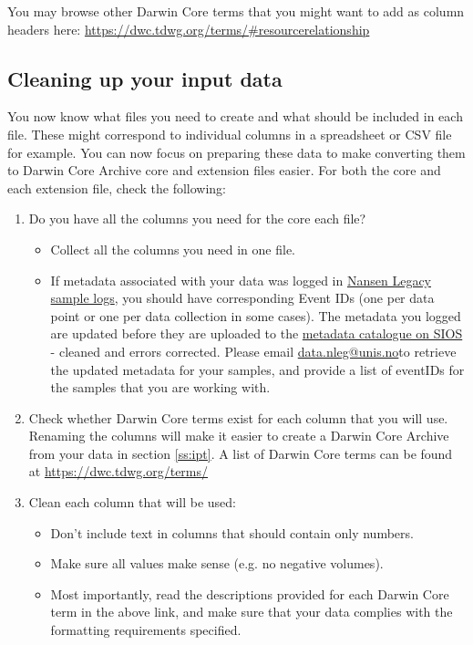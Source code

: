 \documentclass[a4paper,english, 11pt]{article}
\makeatletter
\newcommand{\emailme}{\href{mailto:data.nleg@unis.no}{data.nleg@unis.no}}
\makeatother
\begin{document}
You may browse other Darwin Core terms that you might want to add as column headers here:
\url{https://dwc.tdwg.org/terms/#resourcerelationship}
 
\subsection{Cleaning up your input data}
\label{ss:cleaningdwca}

You now know what files you need to create and what should be included in each file. These might correspond to individual columns in a spreadsheet or CSV file for example. You can now focus on preparing these data to make converting them to Darwin Core Archive core and extension files easier. For both the core and each extension file, check the following:

\begin{enumerate}
\item Do you have all the columns you need for the core each file?
\begin{itemize}
\item Collect all the columns you need in one file.
\item If metadata associated with your data was logged in \href{https://sios-svalbard.org/cgi-bin/darwinsheet/?setup=aen}{Nansen Legacy sample logs}, you should have corresponding Event IDs (one per data point or one per data collection in some cases). The metadata you logged are updated before they are uploaded to the \href{https://sios-svalbard.org/aen/tools}{metadata catalogue on SIOS} - cleaned and errors corrected. 
Please email \emailme to retrieve the updated metadata for your samples, and provide a list of eventIDs for the samples that you are working with.
\end{itemize}
\item Check whether Darwin Core terms exist for each column that you will use. Renaming the columns will make it easier to create a Darwin Core Archive from your data in section \ref{ss:ipt}. A list of Darwin Core terms can be found at \url{https://dwc.tdwg.org/terms/}
\item Clean each column that will be used:
\begin{itemize}
\item Don't include text in columns that should contain only numbers.
\item Make sure all values make sense (e.g. no negative volumes).
\item Most importantly, read the descriptions provided for each Darwin Core term in the above link, and make sure that your data complies with the formatting requirements specified.
\end{itemize}
\end{enumerate}
\end{document}
